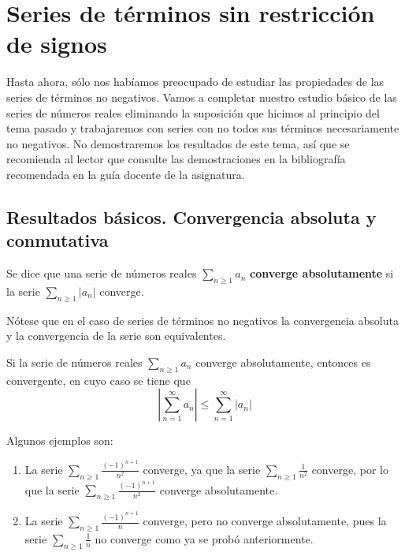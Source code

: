 \chapter{Series de términos sin restricción de signos}

Hasta ahora, sólo nos habíamos preocupado de estudiar las propiedades de las series de términos no negativos. Vamos a completar nuestro estudio básico de las series de números reales eliminando la suposición que hicimos al principio del tema pasado y trabajaremos con series con no todos sus términos necesariamente no negativos. No demostraremos los resultados de este tema, así que se recomienda al lector que consulte las demostraciones en la bibliografía recomendada en la guía docente de la asignatura.


\section{Resultados básicos. Convergencia absoluta y conmutativa}
\begin{definicion}
    Se dice que una serie de números reales $\displaystyle\sum_{n \geq 1} a_n$ \textbf{converge absolutamente} si la serie $\displaystyle\sum_{n \geq 1} |a_n|$ converge.
\end{definicion}

Nótese que en el caso de series de términos no negativos la convergencia absoluta y la convergencia de la serie son equivalentes.

\begin{teo}
    Si la serie de números reales $\displaystyle\sum_{n \geq 1} a_n$ converge absolutamente, entonces es convergente, en cuyo caso se tiene que
    \begin{equation*}
        \left| \displaystyle\sum_{n = 1}^{\infty} a_n \right| \leq \displaystyle\sum_{n = 1}^{\infty} |a_n|
    \end{equation*}
\end{teo}

\begin{ejemplo}
    Algunos ejemplos son:
    \begin{enumerate}
        \item La serie $\displaystyle\sum_{n \geq 1} \frac{(-1)^{n+1}}{n^2}$ converge, ya que la serie $\displaystyle\sum_{n \geq 1} \frac{1}{n^2}$ converge, por lo que la serie $\displaystyle\sum_{n \geq 1} \frac{(-1)^{n+1}}{n^2}$ converge absolutamente.

        \item La serie $\displaystyle\sum_{n \geq 1} \frac{(-1)^{n+1}}{n}$ converge, pero no converge absolutamente, pues  la serie $\displaystyle\sum_{n \geq 1} \frac{1}{n}$ no converge como ya se probó anteriormente.
    \end{enumerate}
\end{ejemplo}

